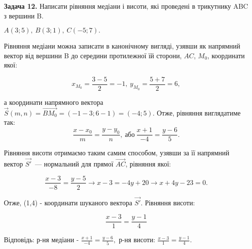 \documentclass[14pt,draft]{extreport}
\begin{document}
\textbf{Задача 12.} Написати рівняння медіани і висоти, які
проведені в трикутнику ABC з вершини B. \medskip

\begin{wrapfigure}{l}{5.3cm}
	\centering

\caption{}
\end{wrapfigure}

$A(3;5),~B(3;1),~C(-5;7).$\medskip

Рівняння медіани можна записати в канонічному вигляді,
узявши як напрямний вектор від вершини B до середини
протилежної їй сторони, $AC$, $M_0$, координати якої:

\begin{equation}
	x_{M_0}=\frac{3-5}{2}=-1,~
	y_{M_0}=\frac{5+7}{2}=6,
\end{equation}

а координати напрямного вектора $\vec{S}(m,n)=\vec{BM_0}=(-1-3;6-1)=(-4;5)$.
Отже, рівняння виглядатиме так:
\begin{equation}
	\frac{x-x_0}{m}=\frac{y-y_0}{n},~\text{або}~
	\frac{x+1}{-4}=\frac{y-6}{5}.
\end{equation}

Рівняння висоти отримаємо таким самим способом, узявши
за її напрямний вектор $\vec{S'}$~--- нормальний для прямої
$\vec{AC}$, рівняння якої:

\begin{equation}
	\frac{x-3}{-8}=\frac{y-5}{2} \rightarrow
	x-3=-4y+20 \rightarrow x+4y-23=0.
\end{equation}

Отже, (1,4) - координати шуканого вектора $\vec{S'}$. Рівняння висоти:

\begin{equation}
	\frac{x-3}{1}=\frac{y-1}{4}
\end{equation}

\medskip

\null\hfill
\begin{boxedminipage}{0.73\textwidth}
Відповідь: р-ня медіани - $\frac{x+1}{-4}=\frac{y-6}{5},$
р-ня висоти: $\frac{x-3}{1}=\frac{y-1}{4}.$
\end{boxedminipage}
\end{document}
